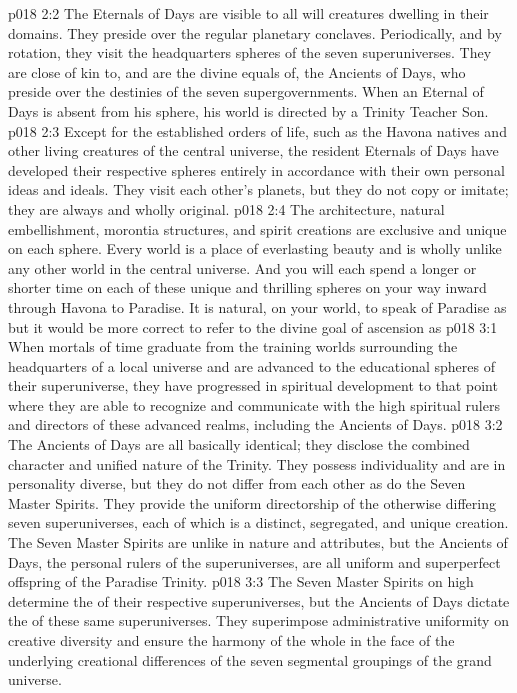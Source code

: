 \vs p018 2:2 The Eternals of Days are visible to all will creatures dwelling in their domains. They preside over the regular planetary conclaves. Periodically, and by rotation, they visit the headquarters spheres of the seven superuniverses. They are close of kin to, and are the divine equals of, the Ancients of Days, who preside over the destinies of the seven supergovernments. When an Eternal of Days is absent from his sphere, his world is directed by a Trinity Teacher Son.
\vs p018 2:3 Except for the established orders of life, such as the Havona natives and other living creatures of the central universe, the resident Eternals of Days have developed their respective spheres entirely in accordance with their own personal ideas and ideals. They visit each other’s planets, but they do not copy or imitate; they are always and wholly original.
\vs p018 2:4 The architecture, natural embellishment, morontia structures, and spirit creations are exclusive and unique on each sphere. Every world is a place of everlasting beauty and is wholly unlike any other world in the central universe. And you will each spend a longer or shorter time on each of these unique and thrilling spheres on your way inward through Havona to Paradise. It is natural, on your world, to speak of Paradise as  but it would be more correct to refer to the divine goal of ascension as 
\vs p018 3:1 When mortals of time graduate from the training worlds surrounding the headquarters of a local universe and are advanced to the educational spheres of their superuniverse, they have progressed in spiritual development to that point where they are able to recognize and communicate with the high spiritual rulers and directors of these advanced realms, including the Ancients of Days.
\vs p018 3:2 The Ancients of Days are all basically identical; they disclose the combined character and unified nature of the Trinity. They possess individuality and are in personality diverse, but they do not differ from each other as do the Seven Master Spirits. They provide the uniform directorship of the otherwise differing seven superuniverses, each of which is a distinct, segregated, and unique creation. The Seven Master Spirits are unlike in nature and attributes, but the Ancients of Days, the personal rulers of the superuniverses, are all uniform and superperfect offspring of the Paradise Trinity.
\vs p018 3:3 The Seven Master Spirits on high determine the  of their respective superuniverses, but the Ancients of Days dictate the  of these same superuniverses. They superimpose administrative uniformity on creative diversity and ensure the harmony of the whole in the face of the underlying creational differences of the seven segmental groupings of the grand universe.
